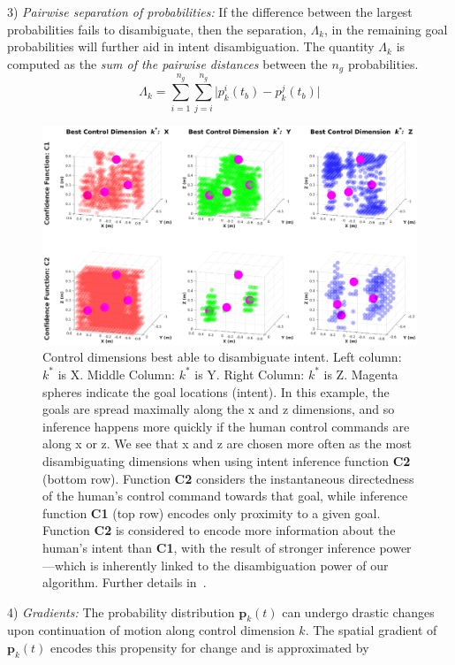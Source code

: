3) \textit{Pairwise separation of probabilities:} If the difference between the largest probabilities fails to disambiguate, then the separation, $\Lambda_k$, in the remaining goal probabilities will further aid in intent disambiguation. The quantity $\Lambda_k$ is computed as the \textit{sum of the pairwise distances} between the $n_g$ probabilities.
\begin{equation}
\Lambda_k = \sum_{i=1}^{n_g}\sum_{j=i}^{n_g}\lvert p^i_k(t_b) - p^j_k(t_b)\rvert
\end{equation}
\begin{figure}[t]
	\centering
	\includegraphics[width = 1.15\hsize, height = 0.6\vsize, center]{./figures/sim_res.eps}
	\caption{Control dimensions best able to disambiguate intent.  Left column: $k^*$ is X. Middle Column: $k^*$ is Y. Right Column: $k^*$ is Z. Magenta spheres indicate the goal locations (intent). In this example, the goals are spread maximally along the x and z dimensions, and so inference happens more quickly if the human control commands are along x or z. We see that x and z are chosen more often as the most disambiguating dimensions when using intent inference function \textbf{C2} (bottom row). Function \textbf{C2} considers the instantaneous directedness of the human's control command towards that goal, while inference function \textbf{C1} (top row) encodes only proximity to a given goal. Function \textbf{C2} is considered to encode more information about the human's intent than \textbf{C1}, with the result of stronger inference power---which is inherently linked to the disambiguation power of our algorithm. Further details in~\cite{gopinath2017mode}.}
	\label{fig:sim_res}
\end{figure}
4) \textit{Gradients:} The probability distribution $\boldsymbol{p}_k(t)$ can undergo drastic changes upon continuation of motion along control dimension $k$. The spatial gradient of $\boldsymbol{p}_k(t)$ encodes this propensity for change and is approximated by 
